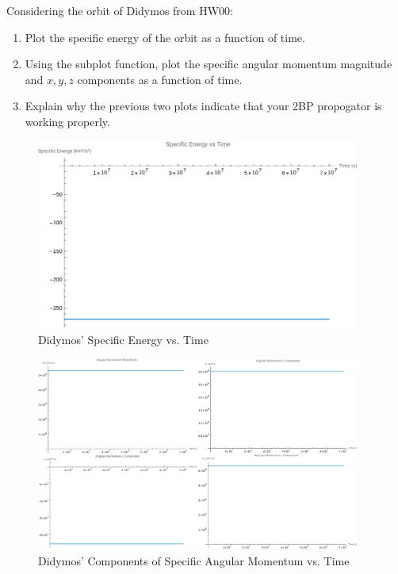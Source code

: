 \begin{hwkProblem}{1}{}

	Considering the orbit of Didymos from HW00:
	\begin{enumerate}
		\item Plot the specific energy of the orbit as a function of time.
		\item Using the subplot function, plot the specific angular momentum magnitude and \( x, y, z \) components as a function of time.
		\item Explain why the previous two plots indicate that your 2BP propogator is working properly.
	\end{enumerate}

	\hwkSol

	\hwkPart

	\begin{figure}[ht]
		\begin{center}
			\includegraphics[width=0.95\textwidth]{./images/s01a.png}
		\end{center}
		\caption{Didymos' Specific Energy vs. Time}\label{fig:s01a}
	\end{figure}

	

	\hwkPart

	\begin{figure}[ht]
		\begin{center}
			\includegraphics[width=0.95\textwidth]{./images/s01b.png}
		\end{center}
		\caption{Didymos' Components of Specific Angular Momentum vs. Time}\label{fig:s01b}
	\end{figure}


\end{hwkProblem}

